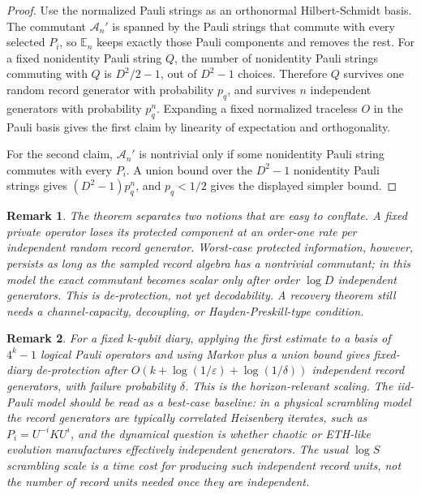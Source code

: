 \documentclass[11pt]{article}
\newtheorem{remark}{Remark}
\newcommand{\cA}{\mathcal A}
\begin{document}
\begin{proof}
Use the normalized Pauli strings as an orthonormal Hilbert-Schmidt
basis.  The commutant $\cA_n'$ is spanned by the Pauli strings that
commute with every selected $P_i$, so $\mathbb E_n$ keeps exactly those
Pauli components and removes the rest.  For a fixed nonidentity Pauli
string $Q$, the number of nonidentity Pauli strings commuting with $Q$
is $D^2/2-1$, out of $D^2-1$ choices.  Therefore $Q$ survives one random
record generator with probability $p_q$, and survives $n$ independent
generators with probability $p_q^n$.  Expanding a fixed normalized
traceless $O$ in the Pauli basis gives the first claim by linearity of
expectation and orthogonality.

For the second claim, $\cA_n'$ is nontrivial only if some nonidentity
Pauli string commutes with every $P_i$.  A union bound over the
$D^2-1$ nonidentity Pauli strings gives
$(D^2-1)p_q^n$, and $p_q<1/2$ gives the displayed simpler bound.
\end{proof}

\begin{remark}
The theorem separates two notions that are easy to conflate.  A fixed
private operator loses its protected component at an order-one rate per
independent random record generator.  Worst-case protected information,
however, persists as long as the sampled record algebra has a nontrivial
commutant; in this model the exact commutant becomes scalar only after
order $\log D$ independent generators.  This is de-protection, not yet
decodability.  A recovery theorem still needs a channel-capacity,
decoupling, or Hayden-Preskill-type condition.
\end{remark}

\begin{remark}
For a fixed $k$-qubit diary, applying the first estimate to a basis of
$4^k-1$ logical Pauli operators and using Markov plus a union bound gives
fixed-diary de-protection after $O(k+\log(1/\varepsilon)+\log(1/\delta))$
independent record generators, with failure probability $\delta$.  This
is the horizon-relevant scaling.  The iid-Pauli model should be read as a
best-case baseline: in a physical scrambling model the record generators
are typically correlated Heisenberg iterates, such as
$P_i=U^{-i}KU^i$, and the dynamical question is whether chaotic or
ETH-like evolution manufactures effectively independent generators.  The
usual $\log S$ scrambling scale is a time cost for producing such
independent record units, not the number of record units needed once they
are independent.
\end{remark}
\end{document}
